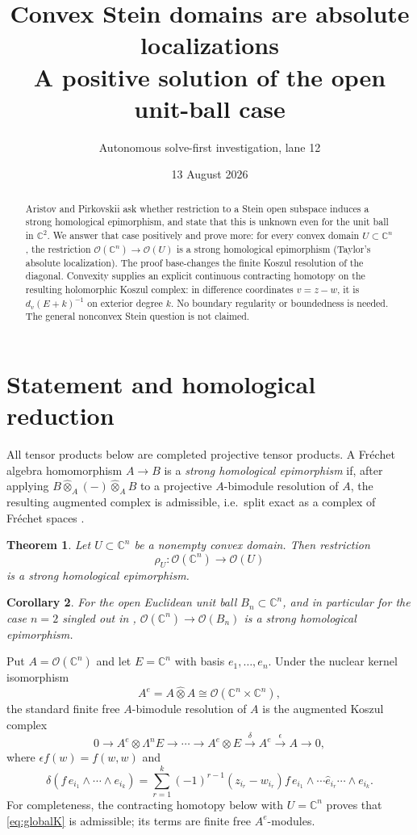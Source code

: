 \documentclass[11pt]{article}
\title{Convex Stein domains are absolute localizations\\
\large A positive solution of the open unit-ball case}
\author{Autonomous solve-first investigation, lane 12}
\date{13 August 2026}
\newtheorem{theorem}{Theorem}
\newtheorem{corollary}[theorem]{Corollary}
\newcommand{\Oh}{\mathcal O}
\newcommand{\C}{\mathbb C}
\newcommand{\htens}{\widehat\otimes}
\begin{document}
\maketitle

\begin{abstract}
Aristov and Pirkovskii ask whether restriction to a Stein open subspace
induces a strong homological epimorphism, and state that this is unknown even
for the unit ball in $\C^2$.  We answer that case positively and prove more:
for every convex domain $U\subset\C^n$, the restriction
$\Oh(\C^n)\to\Oh(U)$ is a strong homological epimorphism (Taylor's absolute
localization).  The proof base-changes the finite Koszul resolution of the
diagonal.  Convexity supplies an explicit continuous contracting homotopy on
the resulting holomorphic Koszul complex: in difference coordinates
$v=z-w$, it is $d_v(E+k)^{-1}$ on exterior degree $k$.  No boundary
regularity or boundedness is needed.  The general nonconvex Stein question
is not claimed.
\end{abstract}

\section{Statement and homological reduction}

All tensor products below are completed projective tensor products.  A
Fréchet algebra homomorphism $A\to B$ is a \emph{strong homological
epimorphism} if, after applying
$B\htens_A(-)\htens_A B$ to a projective $A$-bimodule resolution of $A$,
the resulting augmented complex is admissible, i.e.\ split exact as a
complex of Fréchet spaces \cite{AP}.

\begin{theorem}\label{thm:main}
Let $U\subset\C^n$ be a nonempty convex domain.  Then restriction
\[
 \rho_U:\Oh(\C^n)\longrightarrow\Oh(U)
\]
is a strong homological epimorphism.
\end{theorem}

\begin{corollary}
For the open Euclidean unit ball $B_n\subset\C^n$, and in particular for the
case $n=2$ singled out in \cite[Question 6.1]{AP},
$\Oh(\C^n)\to\Oh(B_n)$ is a strong homological epimorphism.
\end{corollary}

Put $A=\Oh(\C^n)$ and let $E=\C^n$ with basis $e_1,\ldots,e_n$.  Under the
nuclear kernel isomorphism
\[
 A^e=A\htens A\cong\Oh(\C^n\times\C^n),
\]
the standard finite free $A$-bimodule resolution of $A$ is the augmented
Koszul complex
\begin{equation}\label{eq:globalK}
 0\longrightarrow A^e\otimes\Lambda^nE\longrightarrow\cdots
 \longrightarrow A^e\otimes E\xrightarrow{\delta}
 A^e\xrightarrow{\epsilon}A\longrightarrow0,
\end{equation}
where $\epsilon f(w)=f(w,w)$ and
\[
 \delta(f\,e_{i_1}\wedge\cdots\wedge e_{i_k})
 =\sum_{r=1}^k(-1)^{r-1}(z_{i_r}-w_{i_r})f\,
 e_{i_1}\wedge\cdots\widehat e_{i_r}\cdots\wedge e_{i_k}.
\]
For completeness, the contracting homotopy below with $U=\C^n$ proves that
\eqref{eq:globalK} is admissible; its terms are finite free $A^e$-modules.
\end{document}
